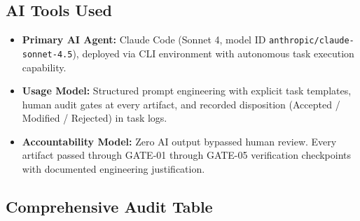 \documentclass[10pt,a4paper]{article}
\begin{document}
\subsection*{AI Tools Used}

\begin{itemize}[leftmargin=*]
 \item \textbf{Primary AI Agent:} Claude Code (Sonnet 4, model ID \texttt{anthropic/claude-sonnet-4.5}), deployed via CLI environment with autonomous task execution capability.
 \item \textbf{Usage Model:} Structured prompt engineering with explicit task templates, human audit gates at every artifact, and recorded disposition (Accepted / Modified / Rejected) in task logs.
 \item \textbf{Accountability Model:} Zero AI output bypassed human review. Every artifact passed through GATE-01 through GATE-05 verification checkpoints with documented engineering justification.
\end{itemize}

\subsection*{Comprehensive Audit Table}
\end{document}
